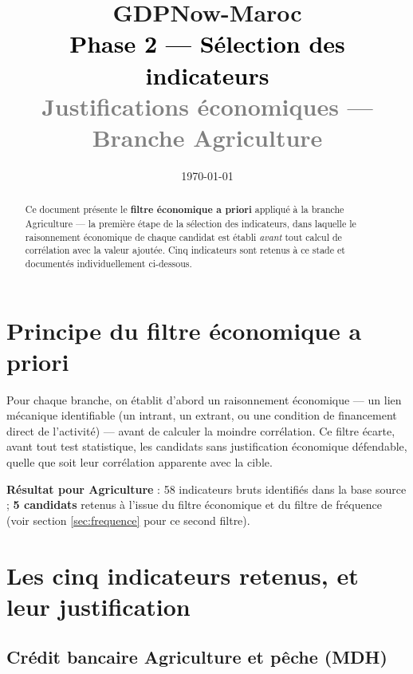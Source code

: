 \documentclass[11pt,a4paper]{article}
\title{\vspace{-1.3cm}\textcolor{bleuprincip}{\Huge\bfseries GDPNow-Maroc}\\[0.3cm]
\textcolor{black}{\Large Phase 2 --- Sélection des indicateurs}\\[0.15cm]
\textcolor{gray}{\large Justifications économiques --- Branche Agriculture}}
\author{}
\date{\today}
\begin{document}
\maketitle
\thispagestyle{empty}

\begin{abstract}
\noindent Ce document présente le \textbf{filtre économique a priori} appliqué à la branche Agriculture --- la première étape de la sélection des indicateurs, dans laquelle le raisonnement économique de chaque candidat est établi \emph{avant} tout calcul de corrélation avec la valeur ajoutée. Cinq indicateurs sont retenus à ce stade et documentés individuellement ci-dessous.
\end{abstract}

\tableofcontents
\vspace{0.3cm}

\section{Principe du filtre économique a priori}

Pour chaque branche, on établit d'abord un raisonnement économique --- un lien mécanique identifiable (un intrant, un extrant, ou une condition de financement direct de l'activité) --- avant de calculer la moindre corrélation. Ce filtre écarte, avant tout test statistique, les candidats sans justification économique défendable, quelle que soit leur corrélation apparente avec la cible.

\begin{fichebox}
\textbf{Résultat pour Agriculture} : 58 indicateurs bruts identifiés dans la base source ; \textbf{5 candidats} retenus à l'issue du filtre économique et du filtre de fréquence (voir section \ref{sec:frequence} pour ce second filtre).
\end{fichebox}

\section{Les cinq indicateurs retenus, et leur justification}

\subsection{Crédit bancaire Agriculture et pêche (MDH)}
\end{document}

